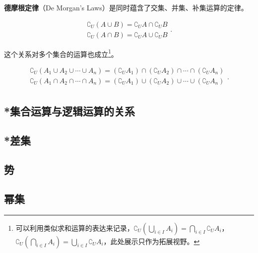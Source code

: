 \textbf{德摩根定律}（De Morgan’s Laws）是同时蕴含了交集、并集、补集运算的定律。

\begin{equation}
\begin{array}{c} 
 \complement_U(A \cup B) = \complement_U A \cap \complement_U B \\  
\complement_U(A \cap B) = \complement_U A \cup \complement_U B
\end{array}.~
\end{equation}

这个关系对多个集合的运算也成立\footnote{可以利用类似求和运算的表达来记录，$\displaystyle\complement_U(\bigcup_{i\in I} A_i)=\bigcap_{i\in I} {\complement_UA_i}$，$\displaystyle\complement_U(\bigcap_{i\in I} A_i)=\bigcup_{i\in I} {\complement_UA_i}$，此处展示只作为拓展视野。}。

\begin{equation}
\begin{array}{c} 
\displaystyle
\complement_U(A_1\cup A_2\cup\cdots\cup A_n)=(\complement_UA_1)\cap (\complement_UA_2)\cap\cdots\cap(\complement_UA_n)\\  
\displaystyle
\complement_U(A_1\cap A_2\cap\cdots\cap A_n)=(\complement_UA_1)\cup (\complement_UA_2)\cup\cdots\cup(\complement_UA_n)\\  
\end{array}.~
\end{equation}


\subsection{*集合运算与逻辑运算的关系}



\subsection{*差集}
\subsection{势}
\subsection{幂集}
